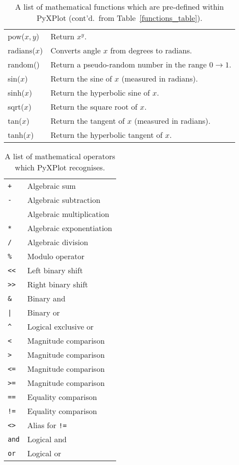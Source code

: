 \begin{table}
\begin{tabular}{|lp{8cm}|}
\hline
pow($x,y$)&
Return $x^y$.\\
radians($x$)&
Converts angle $x$ from degrees to radians.\\
random()&
Return a pseudo-random number in the range $0\to1$.\\
sin($x$)&
Return the sine of $x$ (measured in radians).\\
sinh($x$)&
Return the hyperbolic sine of $x$.\\
sqrt($x$)&
Return the square root of $x$.\\
tan($x$)&
Return the tangent of $x$ (measured in radians).\\
tanh($x$)&
Return the hyperbolic tangent of $x$.\\
\hline
\end{tabular}
\caption{A list of mathematical functions which are pre-defined within PyXPlot (cont'd.\ from Table~\ref{functions_table}).}
\label{functions_table2}
\end{table}

\begin{table}
\begin{tabular}{|lp{8cm}|}
\hline
{\tt +} & Algebraic sum \\
{\tt -} & Algebraic subtraction \\
{\tt *} & Algebraic multiplication \\
{\tt **} & Algebraic exponentiation \\
{\tt /} & Algebraic division \\
{\tt \%} & Modulo operator \\
{\tt <<} & Left binary shift \\
{\tt >>} & Right binary shift \\
{\tt \&} & Binary and \\
{\tt |} & Binary or \\
{\tt \^{}} & Logical exclusive or \\
{\tt <} & Magnitude comparison \\
{\tt >} & Magnitude comparison \\
{\tt <=} & Magnitude comparison \\
{\tt >=} & Magnitude comparison \\
{\tt ==} & Equality comparison \\
{\tt !=} & Equality comparison \\
{\tt <>} & Alias for {\tt !=} \\
{\tt and} & Logical and \\
{\tt or} & Logical or \\
\hline
\end{tabular}
\caption{A list of mathematical operators which PyXPlot recognises.}
\label{operators_table}
\end{table}

